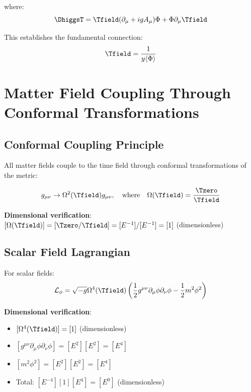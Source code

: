 	where:
	\begin{equation}
		\DhiggsT = \Tfield (\partial_\mu + ig A_\mu) \Phi + \Phi \partial_\mu \Tfield
		\label{eq:higgs_connection}
	\end{equation}
	
	This establishes the fundamental connection:
	\begin{equation}
		\Tfield = \frac{1}{y\langle\Phi\rangle}
		\label{eq:time_higgs_relation}
	\end{equation}
	
	\section{Matter Field Coupling Through Conformal Transformations}
	\label{sec:matter_coupling}
	
	\subsection{Conformal Coupling Principle}
	\label{subsec:conformal_coupling}
	
	All matter fields couple to the time field through conformal transformations of the metric:
	
	\begin{equation}
		g_{\mu\nu} \to \Omega^2(\Tfield) g_{\mu\nu}, \quad \text{where} \quad \Omega(\Tfield) = \frac{\Tzero}{\Tfield}
		\label{eq:conformal_transformation}
	\end{equation}
	
	\textbf{Dimensional verification}: $[\Omega(\Tfield)] = [\Tzero/\Tfield] = [E^{-1}]/[E^{-1}] = [1]$ (dimensionless) \checkmark
	
	\subsection{Scalar Field Lagrangian}
	\label{subsec:scalar_field_lagrangian}
	
	For scalar fields:
	\begin{equation}
		\mathcal{L}_\phi = \sqrt{-g} \Omega^4(\Tfield) \left(\frac{1}{2} g^{\mu\nu} \partial_\mu \phi \partial_\nu \phi - \frac{1}{2} m^2 \phi^2\right)
		\label{eq:scalar_lagrangian}
	\end{equation}
	
	\textbf{Dimensional verification}:
	\begin{itemize}
		\item $[\Omega^4(\Tfield)] = [1]$ (dimensionless)
		\item $[g^{\mu\nu} \partial_\mu \phi \partial_\nu \phi] = [E^2][E^2] = [E^4]$
		\item $[m^2 \phi^2] = [E^2][E^2] = [E^4]$
		\item Total: $[E^{-4}][1][E^4] = [E^0]$ (dimensionless) \checkmark
	\end{itemize}
	
